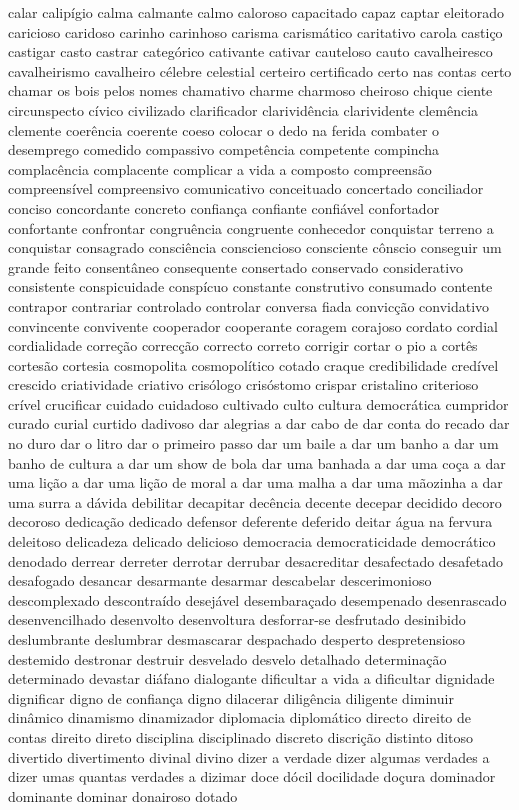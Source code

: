 \documentclass[ruledheader]{abnt_UFF}
\begin{document}
calar calip\'{i}gio calma calmante calmo caloroso capacitado capaz captar eleitorado caricioso caridoso carinho carinhoso carisma carism\'{a}tico caritativo carola casti\c{c}o castigar casto castrar categ\'{o}rico cativante cativar cauteloso cauto cavalheiresco cavalheirismo cavalheiro c\'{e}lebre celestial certeiro certificado certo nas contas certo chamar os bois pelos nomes chamativo charme charmoso cheiroso chique ciente circunspecto c\'{i}vico civilizado clarificador clarivid\^{e}ncia clarividente clem\^{e}ncia clemente coer\^{e}ncia coerente coeso colocar o dedo na ferida combater o desemprego comedido compassivo compet\^{e}ncia competente compincha complac\^{e}ncia complacente complicar a vida a composto compreens\~ao compreens\'{i}vel compreensivo comunicativo conceituado concertado conciliador conciso concordante concreto confian\c{c}a confiante confi\'{a}vel confortador confortante confrontar congru\^{e}ncia congruente conhecedor conquistar terreno a conquistar consagrado consci\^{e}ncia consciencioso consciente c\^{o}nscio conseguir um grande feito consent\^{a}neo consequente consertado conservado considerativo consistente conspicuidade consp\'{i}cuo constante construtivo consumado contente contrapor contrariar controlado controlar conversa fiada convic\c{c}\~ao convidativo convincente convivente cooperador cooperante coragem corajoso cordato cordial cordialidade corre\c{c}\~ao correc\c{c}\~ao correcto correto corrigir cortar o pio a cort\^{e}s cortes\~ao cortesia cosmopolita cosmopol\'{i}tico cotado craque credibilidade cred\'{i}vel crescido criatividade criativo cris\'{o}logo cris\'{o}stomo crispar cristalino criterioso cr\'{i}vel crucificar cuidado cuidadoso cultivado culto cultura democr\'{a}tica cumpridor curado curial curtido dadivoso dar alegrias a dar cabo de dar conta do recado dar no duro dar o litro dar o primeiro passo dar um baile a dar um banho a dar um banho de cultura a dar um show de bola dar uma banhada a dar uma co\c{c}a a dar uma li\c{c}\~ao a dar uma li\c{c}\~ao de moral a dar uma malha a dar uma m\~aozinha a dar uma surra a d\'{a}vida debilitar decapitar dec\^{e}ncia decente decepar decidido decoro decoroso dedica\c{c}\~ao dedicado defensor deferente deferido deitar \'{a}gua na fervura deleitoso delicadeza delicado delicioso democracia democraticidade democr\'{a}tico denodado derrear derreter derrotar derrubar desacreditar desafectado desafetado desafogado desancar desarmante desarmar descabelar descerimonioso descomplexado descontra\'{i}do desej\'{a}vel desembara\c{c}ado desempenado desenrascado desenvencilhado desenvolto desenvoltura desforrar-se desfrutado desinibido deslumbrante deslumbrar desmascarar despachado desperto despretensioso destemido destronar destruir desvelado desvelo detalhado determina\c{c}\~ao determinado devastar di\'{a}fano dialogante dificultar a vida a dificultar dignidade dignificar digno de confian\c{c}a digno dilacerar dilig\^{e}ncia diligente diminuir din\^{a}mico dinamismo dinamizador diplomacia diplom\'{a}tico directo direito de contas direito direto disciplina disciplinado discreto discri\c{c}\~ao distinto ditoso divertido divertimento divinal divino dizer a verdade dizer algumas verdades a dizer umas quantas verdades a dizimar doce d\'{o}cil docilidade do\c{c}ura dominador dominante dominar donairoso dotado 
\end{document}
